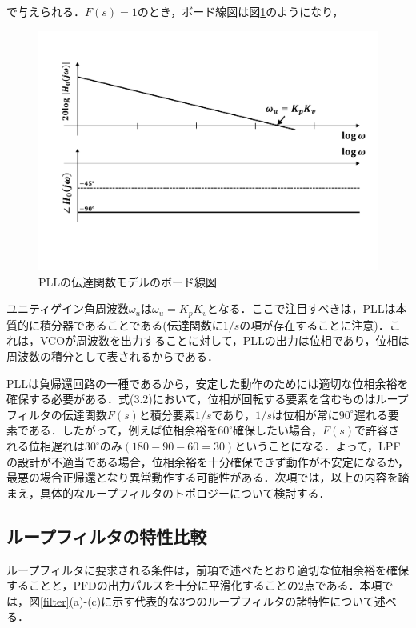 で与えられる．$F(s)=1$のとき，ボード線図は図\ref{pllbode}のようになり，
\begin{figure}[t]
\begin{center}
\includegraphics[width=120mm]{figures/pllbode.pdf}
\caption{PLLの伝達関数モデルのボード線図}
\label{pllbode}
\end{center}
\end{figure}
ユニティゲイン角周波数$\omega_u$は$\omega_u=K_pK_v$となる．ここで注目すべきは，PLLは本質的に積分器であることである(伝達関数に$1/s$の項が存在することに注意)．これは，VCOが周波数を出力することに対して，PLLの出力は位相であり，位相は周波数の積分として表されるからである．\par
PLLは負帰還回路の一種であるから，安定した動作のためには適切な位相余裕を確保する必要がある．式(3.2)において，位相が回転する要素を含むものはループフィルタの伝達関数$F(s)$と積分要素$1/s$であり，$1/s$は位相が常に$90 ^ \circ$遅れる要素である．したがって，例えば位相余裕を$60 ^ \circ$確保したい場合，$F(s)$で許容される位相遅れは$30 ^ \circ$のみ$(180-90-60=30)$ということになる．よって，LPFの設計が不適当である場合，位相余裕を十分確保できず動作が不安定になるか，最悪の場合正帰還となり異常動作する可能性がある．次項では，以上の内容を踏まえ，具体的なループフィルタのトポロジーについて検討する．

\subsection{ループフィルタの特性比較}
ループフィルタに要求される条件は，前項で述べたとおり適切な位相余裕を確保することと，PFDの出力パルスを十分に平滑化することの2点である．本項では，図\ref{filter}(a)-(c)に示す代表的な3つのループフィルタの諸特性について述べる．

